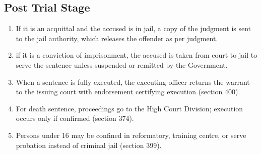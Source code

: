 \subsection{Post Trial Stage}
\begin{enumerate}[label=$(\roman*)$, itemsep=1em]
   \item If it is an acquittal and the accused is in jail, a copy of the judgment is sent to the jail authority, which releases the offender as per judgment.
   \item if it is a conviction of imprisonment, the accused is taken from court to jail to serve the sentence unless suspended or remitted by the Government.
   \item When a sentence is fully executed, the executing officer returns the warrant to the issuing court with endorsement certifying execution (section 400).
   \item For death sentence, proceedings go to the High Court Division; execution occurs only if confirmed (section 374).
   \item Persons under 16 may be confined in reformatory, training centre, or serve probation instead of criminal jail (section 399).
\end{enumerate}
